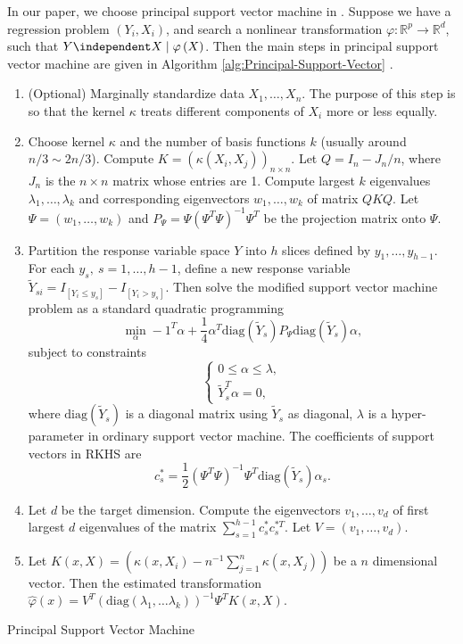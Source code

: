 In our paper, we choose principal support vector machine in \citet{li2011principal}.
Suppose we have a regression problem $\left(Y_{i},X_{i}\right)$,
and search a nonlinear transformation $\varphi:\mathbb{R}^{p}\rightarrow\mathbb{R}^{d}$,
such that $Y\independent X\mid\varphi\left(X\right)$. Then the main
steps in principal support vector machine are given in Algorithm \ref{alg:Principal-Support-Vector}
. 

\begin{algorithm}
\begin{enumerate}
\item (Optional) Marginally standardize data $X_{1},\ldots,X_{n}$. The
purpose of this step is so that the kernel $\kappa$ treats different
components of $X_{i}$ more or less equally. 
\item Choose kernel $\kappa$ and the number of basis {{} } {functions
}$k$ (usually around $n/3\sim2n/3$). Compute $K=\left(\kappa\left(X_{i},X_{j}\right)\right)_{n\times n}$.
Let $Q=I_{n}-J_{n}/n$, where $J_{n}$ is the $n\times n$ matrix
whose entries are 1. Compute largest $k$ eigenvalues $\lambda_{1},\ldots,\lambda_{k}$
and corresponding eigenvectors $w_{1},\ldots,w_{k}$ of matrix $QKQ$.
Let $\Psi=\left(w_{1},\ldots,w_{k}\right)$ and $P_{\Psi}=\Psi\left(\Psi^{T}\Psi\right)^{-1}\Psi^{T}$
be the projection matrix onto $\Psi$.
\item \label{enu:svm}Partition the response variable space $Y$ into $h$
slices defined by $y_{1},\ldots,y_{h-1}$. For each $y_{s},\: s=1,\ldots,h-1$,
define a new response variable $\tilde{Y}_{si}=I_{\left[Y_{i}\le y_{s}\right]}-I_{\left[Y_{i}>y_{s}\right]}$.
Then solve the modified support vector machine problem as a standard
quadratic programming 
\[
\min_{\alpha}-1^{T}\alpha+\frac{1}{4}\alpha^{T}\mathrm{diag}\left(\tilde{Y}_{s}\right)P_{\Psi}\mathrm{diag}\left(\tilde{Y}_{s}\right)\alpha,
\]
subject to constraints
\[
\begin{cases}
0\le\alpha\le\lambda,\\
\tilde{Y}_{s}^{T}\alpha=0,
\end{cases}
\]
where $\mathrm{diag}\left(\tilde{Y}_{s}\right)$ is a diagonal matrix
using $\tilde{Y}_{s}$ as diagonal, $\lambda$ is a hyper-parameter
in ordinary support vector machine. The coefficients of support vectors
in RKHS {{} } {are} 
\[
c_{s}^{*}=\frac{1}{2}\left(\Psi^{T}\Psi\right)^{-1}\Psi^{T}\mathrm{diag}\left(\tilde{Y}_{s}\right)\alpha_{s}.
\]

\item \label{enu:pca}Let $d$ be the target dimension. Compute the eigenvectors
$v_{1},\ldots,v_{d}$ of first largest $d$ eigenvalues of the matrix
$\sum_{s=1}^{h-1}c_{s}^{*}c_{s}^{*T}$. Let $V=\left(v_{1},\ldots,v_{d}\right).$
\item Let $K\left(x,X\right)=\left(\kappa\left(x,X_{i}\right)-n^{-1}\sum_{j=1}^{n}\kappa\left(x,X_{j}\right)\right)$
be a $n$ dimensional vector. Then the estimated transformation $\hat{\varphi}\left(x\right)=V^{T}\left(\mathrm{diag}\left(\lambda_{1},\ldots\lambda_{k}\right)\right)^{-1}\Psi^{T}K\left(x,X\right).$
\end{enumerate}
\protect\caption{Principal Support Vector Machine\label{alg:Principal-Support-Vector}}
\end{algorithm}
